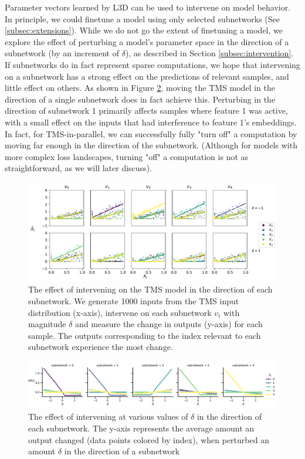 \documentclass{article}
\theoremstyle{plain}
\theoremstyle{definition}
\theoremstyle{remark}
\begin{document}
Parameter vectors learned by L3D can be used to intervene on model behavior. In principle, we could finetune a model using only selected subnetworks (See \ref{subsec:extensions}). While we do not go the extent of finetuning a model, we explore the effect of perturbing a model's parameter space in the direction of a subnetwork (by an increment of $\delta$), as described in Section \ref{subsec:intervention}. If subnetworks do in fact represent sparse computations, we hope that intervening on a subnetwork has a strong effect on the predictions of relevant samples, and little effect on others. As shown in Figure \ref{fig:4_tms_intervention}, moving the TMS model in the direction of a single subnetwork does in fact achieve this. Perturbing in the direction of subnetwork 1 primarily affects samples where feature 1 was active, with a small effect on the inputs that had interference to feature 1's embeddings. In fact, for TMS-in-parallel, we can successfully fully "turn off" a computation by moving far enough in the direction of the subnetwork. (Although for models with more complex loss landscapes, turning "off" a computation is not as straightforward, as we will later discuss).

\begin{figure}
    \centerline{\includegraphics[width=\columnwidth]{../figures/4_tms_intervention.pdf}}
    \centering
    \caption{The effect of intervening on the TMS model in the direction of each subnetwork. We generate 1000 inputs from the TMS input distribution (x-axis), intervene on each subnetwork $v_i$ with magnitude $\delta$ and measure the change in outputs (y-axis) for each sample. The outputs corresponding to the index relevant to each subnetwork experience the most change.}\label{fig:4_tms_intervention}
\end{figure}

\begin{figure}
    \centerline{\includegraphics[width=\columnwidth]{../figures/4_tms_intervention_mean.pdf}}
    \centering
    \caption{The effect of intervening at various values of $\delta$ in the direction of each subnetwork. The y-axis represents the average amount an output changed (data points colored by index), when perturbed an amount $\delta$ in the direction of a subnetwork }\label{fig:4_tms_intervention}
\end{figure}
\end{document}
